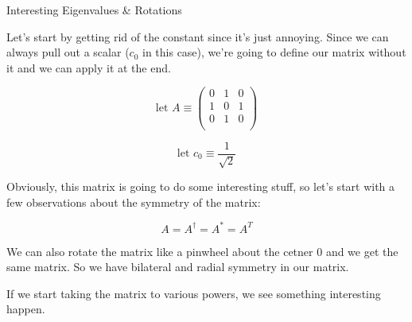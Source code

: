 \begin{answer}

  \begin{answerpart}{Interesting Eigenvalues \& Rotations}

    Let's start by getting rid of the constant since it's just
    annoying.  Since we can always pull out a scalar ($c_0$ in this
    case), we're going to define our matrix without it and we can
    apply it at the end.

    \begin{equation}
      \text{let } A \equiv
      \begin{pmatrix}
        0 & 1 & 0\\
        1 & 0 & 1\\
        0 & 1 & 0\\
      \end{pmatrix}
    \end{equation}

    \begin{equation}
      \text{let } c_0 \equiv \frac{1}{\sqrt{2}}
    \end{equation}

    Obviously, this matrix is going to do some interesting stuff, so
    let's start with a few observations about the symmetry of the
    matrix:

    \begin{equation}
      A = A^\dagger = A^* = A^T
    \end{equation}

    We can also rotate the matrix like a pinwheel about the cetner 0
    and we get the same matrix.  So we have bilateral and radial
    symmetry in our matrix.

    If we start taking the matrix to various powers, we see something
    interesting happen.


\end{answerpart}
\end{answer}

